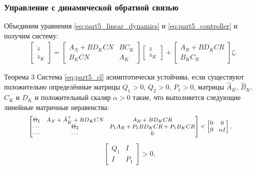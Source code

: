 \begin{frame}
	\frametitle{Управление с динамической обратной связью}
		Объединим уравнения \eqref{eq:part5_linear_dynamics} и \eqref{eq:part5_controller} и получим систему:
	\begin{align}
		\label{eq:part5_cl}
		&\begin{bmatrix}
			{\dot{z}} \\ {\dot{z}}_K 
		\end{bmatrix}
		=
		\begin{bmatrix}
			{A}_N + {B}{D}_K{C}{N} & {B}{C}_K \\
			{B}_K{C}{N} &{A}_K
		\end{bmatrix}
		\begin{bmatrix}
			{z} \\ {z}_K 
		\end{bmatrix}
		+
		\begin{bmatrix}
			{A}_R + {B}{D}_K{C}{R}\\ {B}_K{C}_R
		\end{bmatrix}
		{\zeta}.
	\end{align}
	\begin{block}{Теорема 3}
		Система \eqref{eq:part5_cl}  асимптотически устойчива, если существуют положительно определённые матрицы ${Q}_1>0$, ${Q}_2>0$, ${P}_1>0$, матрицы $\hat{{A}}_K$,  $\hat{{B}}_K$, $\hat{{C}}_K$ и $D_K$
		и положительный скаляр $\alpha>0$ такие, что выполняется следующие линейные матричные неравенства:
		\[
		\begin{medsize}
			\begin{bmatrix}
				{\Theta}_1  & {A}_N + {\hat{A}}_K\T +{B}{D}_K{C}{N} & {A}_R + {B}{D}_K{C}{R}\\
				\cdots & {\Theta}_2 & {P}_{1}{A}_R + {P}_{1}{B}{D}_K{C}{R}+{P}_1{B}_K{C}{R}\\
				\cdots & \cdots & 0 
			\end{bmatrix} < 
			\begin{bmatrix}
				0 & 0\\
				0 & \alpha {I}
			\end{bmatrix},
		\end{medsize}\]
		\begin{align*}
			\begin{bmatrix} 
				{Q}_{1} & I \\ 
				I & {P}_{1}
			\end{bmatrix} > 0,
		\end{align*}
	\end{block}
\end{frame}

